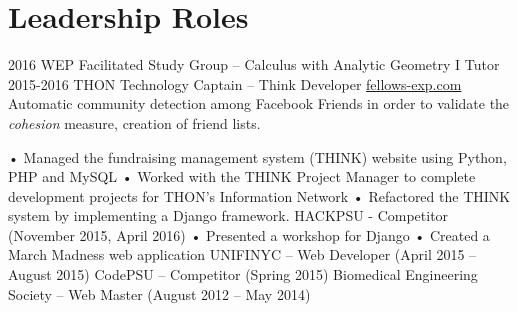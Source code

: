 \documentclass[]{friggeri-cv}
\begin{document}
\section{Leadership Roles}

\begin{entrylist}
  \entry
    {2016}
    {WEP Facilitated Study Group – Calculus with Analytic Geometry I Tutor}
    {}
    {}
  \entry
    {2015-2016}
    {THON Technology Captain – Think Developer}
    {\href{http://fellows-exp.com}{fellows-exp.com}}
    {Automatic community detection among Facebook Friends in order to validate the \emph{cohesion} measure, creation of friend lists.}
\end{entrylist}


 
•	Managed the fundraising management system (THINK) website using Python, PHP and MySQL
•	Worked with the THINK Project Manager to complete development projects for THON’s Information Network	
•	Refactored the THINK system by implementing a Django framework.
HACKPSU - Competitor (November 2015, April 2016)
•	Presented a workshop for Django
•	Created a March Madness web application
UNIFINYC – Web Developer (April 2015 – August 2015)
CodePSU – Competitor (Spring 2015)
Biomedical Engineering Society – Web Master (August 2012 – May 2014)

 
\end{document}
